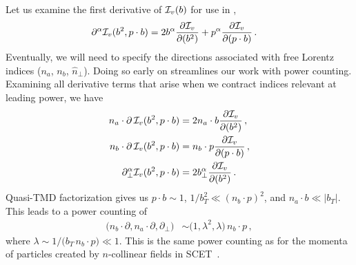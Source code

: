 \documentclass[11pt,a4paper]{article}
\newcommand{\nn}{\nonumber}
\begin{document}
Let us examine the first derivative of ${\cal I}_v(b)$ for use in ,
\begin{align}
	\partial^\alpha {\cal I}_v(b^2,p\cdot b) &
	= 2b^\alpha \frac{\partial {\cal I}_v}{\partial (b^2)} + p^\alpha \frac{\partial {\cal I}_v}{\partial (p\cdot b)}
	\,.\end{align}
Eventually, we will need to specify the directions associated with free Lorentz indices ($n_a$, $n_b$, $\hat{n}_\perp$).
Doing so early on streamlines our work with power counting.
Examining all derivative terms that arise when we contract indices relevant at leading power, we have
\begin{align}
	n_a\cdot \partial \,{\cal I}_v(b^2,p\cdot b)&= 2n_a\cdot b \frac{\partial {\cal I}_v}{\partial (b^2)} \,,\nn\\
	n_b\cdot \partial\, {\cal I}_v(b^2,p\cdot b)&= n_b\cdot p \frac{\partial {\cal I}_v}{\partial (p\cdot b)} \,,\nn\\
	\partial^\alpha_\perp {\cal I}_v(b^2,p\cdot b)&=2b^\alpha_\perp \frac{\partial {\cal I}_v}{\partial (b^2)} \,.
\end{align}
Quasi-TMD factorization gives us $p\cdot b\sim1$, $1/b_T^2 \ll (n_b\cdot p)^2$, and $n_a\cdot b \ll |b_T|$. This leads to a power counting of
\begin{align} 
	\big(n_b\cdot \partial, n_a\cdot \partial,  \partial_\perp\big) &\sim \big(1, \lambda^2, \lambda) \, n_b\cdot p\,,
\end{align}
where $\lambda \sim 1/\big( b_T\,n_b\cdot p\big)\ll 1$. This is the same power counting as for the momenta of particles created by $n$-collinear fields in SCET~\cite{Bauer:2000ew,Bauer:2001ct,Bauer:2000yr,Bauer:2001yt}.
\end{document}
